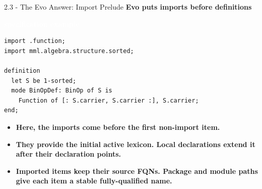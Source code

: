 \documentclass[aspectratio=169,11pt]{beamer}
\newcommand{\statusbadge}[2]{\colorbox{#1}{\textcolor{white}{\strut\scriptsize\sffamily\bfseries #2}}}
\newcommand{\badgeSpec}{\statusbadge{green!35!black}{specification example}}
\begin{document}
\begin{frame}[fragile,t]{2.3 - The Evo Answer: Import Prelude}
\smallskip
\textbf{\textcolor{blue!55!black}{\textbf{Evo puts imports before definitions}}}~\badgeSpec
\begin{lstlisting}[language={mizar},basicstyle=\ttfamily\footnotesize]
import .function;
import mml.algebra.structure.sorted;

definition
  let S be 1-sorted;
  mode BinOpDef: BinOp of S is
    Function of [: S.carrier, S.carrier :], S.carrier;
end;
\end{lstlisting}
\begin{itemize}
\setlength{\itemsep}{1pt}
\setlength{\parsep}{0pt}
\setlength{\parskip}{0pt}
\item \textcolor{blue!55!black}{\textbf{Here, the imports come before the first non-import item.}}
\item \textcolor{blue!55!black}{\textbf{They provide the initial active lexicon. Local declarations extend it after their declaration points.}}
\item \textcolor{blue!55!black}{\textbf{Imported items keep their source FQNs. Package and module paths give each item a stable fully-qualified name.}}
\end{itemize}
\end{frame}
\end{document}
